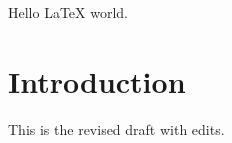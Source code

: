 \documentclass{article}
\begin{document}
Hello \LaTeX{} world.
\section{Introduction}
This is the revised draft with edits.
\end{document}
